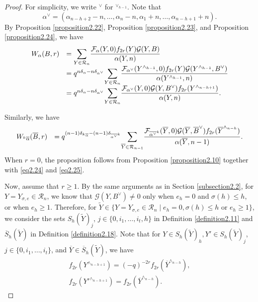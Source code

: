 \documentclass[11pt,oneside]{amsart}
\theoremstyle{plain}
\theoremstyle{definition}
\theoremstyle{remark}
\newcommand{\tx}[1]{\text{#1}}
\newcommand{\CF}{{\mathcal F}}
\newcommand{\CG}{{\mathcal G}}
\newcommand{\CR}{{\mathcal R}}
\numberwithin{equation}{section}
\begin{document}
	\begin{proof}
		For simplicity, we write $^{\vee}$ for $^{\vee_{h-1}}$. Note that
		\begin{equation*}
			\alpha^{\vee}=(\alpha_{n-h+2}-n,\dots,\alpha_n-n,\alpha_1+n,\dots,\alpha_{n-h+1}+n).
		\end{equation*}
		By Proposition \ref{proposition2.22}, Proposition \ref{proposition2.23}, and Proposition \ref{proposition2.24}, we have
		\begin{equation}\label{eq2.24}
			\begin{array}{ll}
				W_{\alpha}(B,r)&=\mathlarger{\sum}_{Y \in \CR_n}\dfrac{\CF_{\alpha}(Y,0)f_{2r}(Y)\CG(Y,B)}{\alpha(Y,n)}\\
				&=q^{n\delta_{\alpha}-n\delta_{\alpha^{\vee}}}\mathlarger{\sum}_{Y \in \CR_n}\dfrac{\CF_{\alpha^{\vee}}(Y^{\wedge_{h-1}},0)f_{2r}(Y)\CG(Y^{\wedge_{h-1}},B^{\vee})}{\alpha(Y^{\wedge_{h-1}},n)}\\
				&=q^{n\delta_{\alpha}-n\delta_{\alpha^{\vee}}}\mathlarger{\sum}_{Y \in \CR_n}\dfrac{\CF_{\alpha^{\vee}}(Y,0)\CG(Y,B^{\vee})f_{2r}(Y^{\wedge_{n-h+1}})}{\alpha(Y,n)}.
			\end{array}
		\end{equation}
		
		Similarly, we have
		\begin{equation}\label{eq2.25}
			\begin{array}{ll}
				W_{\tx{}^{k}\overline{\alpha}}(\overline{B},r)
				&=q^{(n-1)\delta_{\tx{}^k\overline{\alpha}}-(n-1)\delta_{\overline{\alpha^{\vee}}^{k}}}\mathlarger{\sum}_{\overline{Y} \in \CR_{n-1}}\dfrac{\CF_{\overline{\alpha^{\vee}}^k}(\overline{Y},0)\CG(\overline{Y},\overline{B}^{\vee})f_{2r}(\overline{Y}^{\wedge_{n-h}})}{\alpha(\overline{Y},n-1)}.
			\end{array}
		\end{equation}
		When $r=0$, the proposition follows from Proposition \ref{proposition2.10} together with \eqref{eq2.24} and \eqref{eq2.25}.
		
		Now, assume that $r \geq 1$. By the same arguments as in Section \ref{subsection2.2}, for $Y=Y_{\sigma,e}\in\CR_n$, we know that $\CG(Y,B^{\vee})\neq 0$ only when $e_h=0$ and $\sigma(h)\leq h$, or when $e_h \geq 1$. Therefore, for $\widetilde{Y} \in \lbrace Y=Y_{\sigma,e}\in \CR_n \mid e_h=0, \sigma(h)\leq h \tx{ or }e_h \geq 1 \rbrace$, we consider the sets $S_{h}(\widetilde{Y})_j$, $j\in \lbrace 0,i_1,\dots,i_t,h\rbrace$ in Definition \ref{definition2.11} and $\overline{S}_h(\widetilde{Y})$ in Definition \ref{definition2.18}. Note that for $Y \in S_h(\widetilde{Y})_h, Y' \in S_h(\widetilde{Y})_j$, $j\in \lbrace 0,i_1,\dots,i_t \rbrace$, and $\overline{Y} \in \overline{S}_h(\widetilde{Y})$, we have
		\begin{equation}\label{eq2.26}
			\begin{array}{ll}
				f_{2r}(Y^{\wedge_{n-h+1}})=(-q)^{-2r}f_{2r}(\overline{Y}^{\wedge_{n-h}}),\\
				f_{2r}(Y'^{\wedge_{n-h+1}})=f_{2r}(\overline{Y}^{\wedge_{n-h}}).
			\end{array}
		\end{equation}
		

\end{proof}
\end{document}
